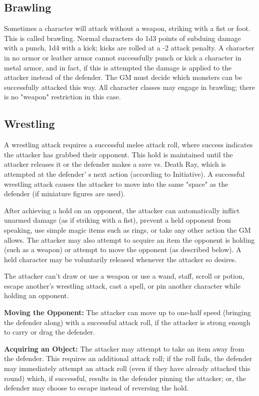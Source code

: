 \documentclass[a4paper,twoside,openany,10pt]{book}
\begin{document}
\begin{multicols}{2}
\subsection{Brawling}\label{brawling}

Sometimes a character will attack without a weapon, striking with a fist or foot. This is called brawling. Normal characters do 1d3 points of subduing damage with a punch, 1d4 with a kick; kicks are rolled at a -2 attack penalty. A character in no armor or leather armor cannot successfully punch or kick a character in metal armor, and in fact, if this is attempted the damage is applied to the attacker instead of the defender. The GM must decide which monsters can be successfully attacked this way. All character classes may engage in brawling; there is no "weapon" restriction in this case.

\subsection{Wrestling}\label{wrestling}

A wrestling attack requires a successful melee attack roll, where success indicates the attacker has grabbed their opponent. This hold is maintained until the attacker releases it or the defender makes a save vs. Death Ray, which is attempted at the defender' s next action (according to Initiative). A successful wrestling attack causes the attacker to move into the same "space" as the defender (if miniature figures are used).

After achieving a hold on an opponent, the attacker can automatically inflict unarmed damage (as if striking with a fist), prevent a held opponent from speaking, use simple magic items such as rings, or take any other action the GM allows. The attacker may also attempt to acquire an item the opponent is holding (such as a weapon) or attempt to move the opponent (as described below). A held character may be voluntarily released whenever the attacker so desires.

The attacker can't draw or use a weapon or use a wand, staff, scroll or potion, escape another's wrestling attack, cast a spell, or pin another character while holding an opponent.

\textbf{Moving the Opponent:} The attacker can move up to one-half speed (bringing the defender along) with a successful attack roll, if the attacker is strong enough to carry or drag the defender.

\textbf{Acquiring an Object: } The attacker may attempt to take an item away from the defender. This requires an additional attack roll; if the roll fails, the defender may immediately attempt an attack roll (even if they have already attacked this round) which, if successful, results in the defender pinning the attacker; or, the defender may choose to escape instead of reversing the hold.


\end{multicols}
\end{document}

